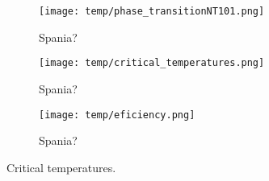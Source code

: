 \begin{figure}[!ht]
    \texttt{[image: temp/phase\_transitionNT101.png]} 
    \caption{Spania?}
    \label{fig:phase_transition_zoomed}
\end{figure} 

\begin{figure}[!ht]
    \texttt{[image: temp/critical\_temperatures.png]} 
    \caption{Spania?}
    \label{fig:critical_temperatures}
\end{figure} 

\begin{figure}[!ht]
    \texttt{[image: temp/eficiency.png]} 
    \caption{Spania?}
    \label{fig:efficiency}
\end{figure} 





\begin{table}[!ht]
    
    \caption{Critical temperatures.}
    \label{tab:critical_temperatures}
\end{table}

